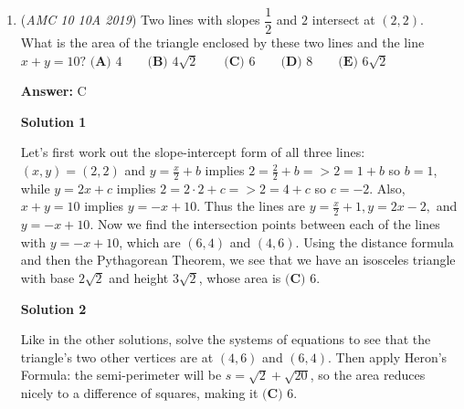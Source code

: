 \begin{enumerate}
 



\textbf{Solution 2}

We can use a process of elimination. Going down the list, we can see a square obviously works. A rectangle that is not a square works as well. Both rhombi and parallelograms don't have a point that is equidistant, but isosceles trapezoids do have such a point. Say we inscribe trapezoid ABCD in a semicircle. This point would thus be the center, so the answer is $\boxed{\textbf{(C) } 3}$.

 



\textbf{Solution 3}

The perpendicular bisector of a line segment is the locus of all points that are equidistant from the endpoints. The question then boils down to finding the shapes where the perpendicular bisectors of the sides all intersect at a point. This is true for a square, rectangle, and isosceles trapezoid, so the answer is $\boxed{\textbf{(C) } 3}$.

 


	\item (\textit{AMC 10 10A 2019}) Two lines with slopes $\dfrac{1}{2}$ and $2$ intersect at $(2,2)$. What is the area of the triangle enclosed by these two lines and the line $x+y=10  ?$
$\textbf{(A) } 4 \qquad\textbf{(B) } 4\sqrt{2} \qquad\textbf{(C) } 6 \qquad\textbf{(D) } 8 \qquad\textbf{(E) } 6\sqrt{2}$

 \textbf{Answer: }C



\textbf{Solution 1}

Let's first work out the slope-intercept form of all three lines:$(x,y)=(2,2)$ and $y=\frac{x}{2} + b$ implies $2=\frac{2}{2} +b=> 2=1+b$ so $b=1$, while $y=2x + c$ implies $2= 2 \cdot 2+c=> 2=4+c$ so $c=-2$. Also, $x+y=10$ implies $y=-x+10$. Thus the lines are $y=\frac{x}{2} +1, y=2x-2,$ and $y=-x+10$. Now we find the intersection points between each of the lines with $y=-x+10$, which are $(6,4)$ and $(4,6)$. Using the distance formula and then the Pythagorean Theorem, we see that we have an isosceles triangle with base $2\sqrt{2}$ and height $3\sqrt{2}$, whose area is $\boxed{\textbf{(C) }6}$.

 



\textbf{Solution 2}

Like in the other solutions, solve the systems of equations to see that the triangle's two other vertices are at $(4, 6)$ and $(6, 4)$. Then apply Heron's Formula: the semi-perimeter will be $s = \sqrt{2} + \sqrt{20}$, so the area reduces nicely to a difference of squares, making it $\boxed{\textbf{(C) }6}$.


\end{enumerate}
